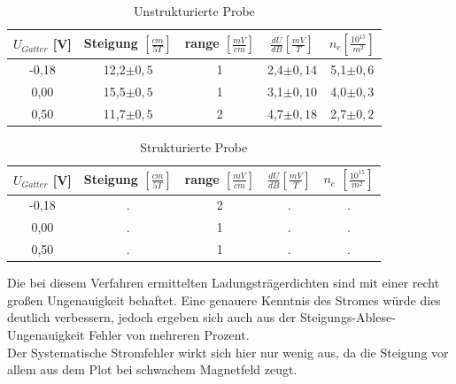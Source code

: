 \documentclass[10pt,a4paper]{article}
\begin{document}
	\begin{table}[h]
 	\caption{Unstrukturierte Probe}
\begin{center}
	\begin{tabular}{|c|c|c|c|c|}
	\hline 
    $U_{Gatter}$ [V] & Steigung $\left[\frac{cm}{5T}\right]$ & range $\left[\frac{mV}{cm}\right]$ & $ \frac{dU}{dB} \left[ \frac{mV}{T} \right]$ & $n_{e} \left[\frac{10^{15}}{m^2}\right]$ \\ 
	\hline \hline
	-0,18 & 12,2$ \pm0,5 $ & 1 & 2,4$ \pm0,14 $ & 5,1$ \pm0,6 $ \\ 
	\hline 
	0,00 & 15,5$ \pm0,5 $ & 1 & 3,1$ \pm0,10 $ & 4,0$ \pm0,3 $ \\ 
	\hline 
	0,50 & 11,7$ \pm0,5 $ & 2 & 4,7$ \pm0,18 $ & 2,7$ \pm0,2 $ \\ 
	\hline 
	\end{tabular}
\end{center}
	\end {table}
	\begin{table}[h]
 	\caption{Strukturierte Probe}
\begin{center}
	\begin{tabular}{|c|c|c|c|c|}
	\hline 
    $U_{Gatter}$ [V] & Steigung $\left[\frac{cm}{5T}\right]$ & range $\left[\frac{mV}{cm}\right]$ & $ \frac{dU}{dB} \left[ \frac{mV}{T} \right]$ & $n_{e}$ $\left[\frac{10^{15}}{m^2}\right]$ \\ 
	\hline \hline
	-0,18 & . & 2 & . & . \\ 
	\hline 
	0,00 & . & 1 & . & . \\ 
	\hline 
	0,50 & . & 1 & . & . \\ 
	\hline 
	\end{tabular}
\end{center}
	\end{table} 
	 Die bei diesem Verfahren ermittelten Ladungsträgerdichten sind mit einer recht großen Ungenauigkeit behaftet. Eine genauere Kenntnis des Stromes würde dies deutlich verbessern, jedoch ergeben sich auch aus der Steigungs-Ablese-Ungenauigkeit Fehler von mehreren Prozent.\\
	 Der Systematische Stromfehler wirkt sich hier nur wenig aus, da die Steigung vor allem aus dem Plot bei schwachem Magnetfeld zeugt.\\
\end{document}

